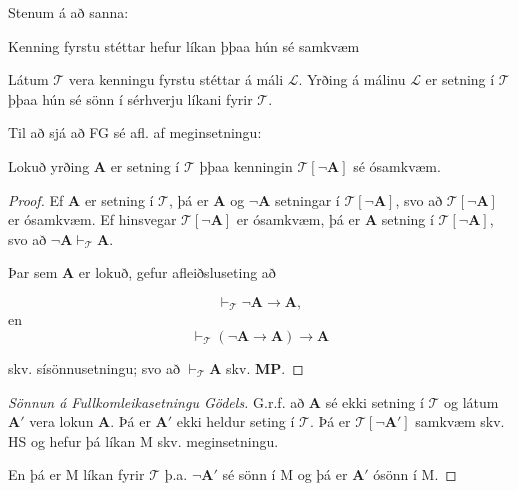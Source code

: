 \documentclass[12pt]{book}
\begin{document}
Stenum á að sanna:

\begin{setn}[Meginsetning]
  Kenning fyrstu stéttar hefur líkan þþaa hún sé samkvæm
\end{setn}

\begin{setn}
  Látum $\mathcal{T}$ vera kenningu fyrstu stéttar á máli $\mathcal{L}$.
  Yrðing á málinu $\mathcal{L}$ er setning í $\mathcal{T}$ þþaa
  hún sé sönn í sérhverju líkani fyrir $\mathcal{T}$.
\end{setn}

Til að sjá að FG sé afl. af meginsetningu:

\begin{setn}[Hjálparsetning]
 Lokuð yrðing $\mathbf{A}$ er setning í $\mathcal{T}$ þþaa
 kenningin $\mathcal{T}[\lnot \mathbf{A}]$ sé ósamkvæm.
\end{setn}




\begin{proof}
 Ef $\mathbf{A}$  er setning í $\mathcal{T}$, þá er $\mathbf{A}$ og $\lnot \mathbf{A}$
 setningar í $\mathcal{T}[\lnot \mathbf{A}]$, svo að
 $\mathcal{T}[\lnot \mathbf{A}]$ er ósamkvæm. Ef hinsvegar
 $\mathcal{T}[\lnot \mathbf{A}]$ er  ósamkvæm, þá er $\mathbf{A}$
 setning í $\mathcal{T}[\lnot \mathbf{A}]$, svo að
 $\lnot \mathbf{A} \vdash_{\mathcal{T}} \mathbf{A}$.

 Þar sem $\mathbf{A}$ er lokuð, gefur afleiðsluseting að

 \[\vdash_{\mathcal{T}} \lnot \mathbf{A} \rightarrow \mathbf{A},\]
 en \[ \vdash_{\mathcal{T}} ( \lnot \mathbf{A} \rightarrow \mathbf{A}) \rightarrow \mathbf{A}\]

 skv. sísönnusetningu; svo að $\vdash_{\mathcal{T}} \mathbf{A}$ skv. \textbf{MP}.

\end{proof}

\begin{proof}[Sönnun á Fullkomleikasetningu Gödels]
  G.r.f. að $\mathbf{A}$ sé ekki setning í $\mathcal{T}$ og látum $\mathbf{A}'$
  vera lokun $\mathbf{A}$. Þá er $\mathbf{A}'$ ekki heldur seting í
  $\mathcal{T}$. Þá er $\mathcal{T}[\lnot \mathbf{A}']$ samkvæm skv. HS og hefur
  þá líkan M skv. meginsetningu.

  En þá er M líkan fyrir $\mathcal{T}$ þ.a. $\lnot \mathbf{A}'$ sé sönn í M
  og þá er $\mathbf{A}'$ ósönn í M.
  
\end{proof}
\end{document}
